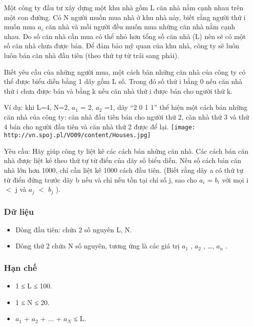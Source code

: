 



        Một công ty đầu tư xây dựng một khu nhà gồm L căn nhà nằm cạnh nhau trên một con đường. Có N người muốn mua nhà ở khu nhà này, biết rằng người thứ i muốn mua $a_{i}$        căn nhà và mỗi người đều muốn mua những căn nhà nằm cạnh nhau. Do số căn nhà cần mua có thể nhỏ hơn tổng số căn nhà (L) nên sẽ có một số căn nhà chưa được bán. Để đảm bảo mỹ quan của khu nhà, công ty sẽ luôn luôn bán căn nhà đầu tiên (theo thứ tự từ trái sang phải).       

        Biết yêu cầu của những người mua, một cách bán những căn nhà của công ty có thể được biểu diễn bằng 1 dãy gồm L số. Trong đó số thứ i bằng 0 nếu căn nhà thứ i chưa được bán và bằng k nếu căn nhà thứ i được bán cho người thứ k.       

        Ví dụ: khi L=4, N=2, $a_{1}$        = 2, $a_{2}$        =1, dãy “2 0 1 1” thể hiện một cách bán những căn nhà của công ty: căn nhà đầu tiên bán cho người thứ 2, căn nhà thứ 3 và thứ 4 bán cho người đầu tiên và căn nhà thứ 2 được để lại.       
\texttt{[image: http://vn.spoj.pl/VO09/content/Houses.jpg]}



   Yêu cầu: Hãy giúp công ty liệt kê các cách bán những căn nhà. Các cách bán căn nhà được liệt kê theo thứ tự từ điển của dãy số biểu diễn. Nếu số cách bán căn nhà lớn hơn 1000, chỉ cần liệt kê 1000 cách đầu tiên. (Biết rằng dãy a có thứ tự từ điển đứng trước dãy b nếu và chỉ nếu tồn tại chỉ số j, sao cho $a_{i}$   = $b_{i}$   với mọi i $<$ j và $a_{j}$   $<$ $b_{j}$   ).  

\subsubsection{   Dữ liệu  }
\begin{itemize}
	\item     Dòng đầu tiên: chứa 2 số nguyên L, N.   
	\item     Dòng thứ 2 chứa N số nguyên, tương ứng là các giá trị $a_{1}$    , $a_{2}$    , …, $a_{n}$    .   
\end{itemize}

\subsubsection{   Hạn chế  }
\begin{itemize}
	\item     1 ≤ L ≤ 100.   
	\item     1 ≤ N ≤ 20.   
	\item     $a_{1}$    + $a_{2}$    + ... + $a_{N}$    ≤ L.   
\end{itemize}

